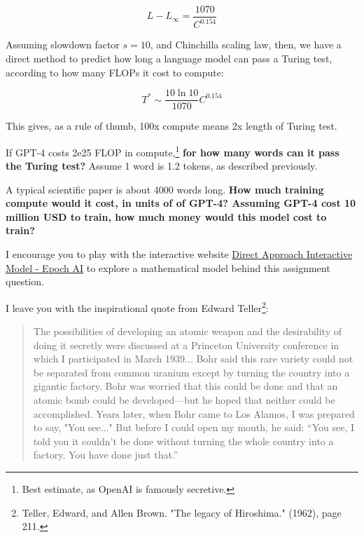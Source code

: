 \begin{enumerate}
    $$L - L_\infty = \frac{1070}{C^{0.154}}$$

    Assuming slowdown factor $s=10$, and Chinchilla scaling law, then, we have a direct method to predict how long a language model can pass a Turing test, according to how many FLOPs it cost to compute:
    
    $$T^* \sim \frac{10\ln 10}{1070}C^{0.154}$$

    This gives, as a rule of thumb, 100x compute means 2x length of Turing test.

    If GPT-4 costs 2e25 FLOP in compute,\footnote{Best estimate, as OpenAI is famously secretive.} \textbf{for how many words can it pass the Turing test?} Assume 1 word is 1.2 tokens, as described previously.


    \qitem  A typical scientific paper is about 4000 words long. \textbf{How much training compute would it cost, in units of of GPT-4? Assuming GPT-4 cost 10 million USD to train, how much money would this model cost to train?}
    

\end{enumerate}

I encourage you to play with the interactive website \href{https://epochai.org/blog/direct-approach-interactive-model}{Direct Approach Interactive Model - Epoch AI} to explore a mathematical model behind this assignment question.

I leave you with the inspirational quote from Edward Teller\footnote{Teller, Edward, and Allen Brown. "The legacy of Hiroshima." (1962), page 211.}:

\begin{quote}
    The possibilities of developing an atomic weapon and the desirability of doing it secretly were discussed at a Princeton University conference in which I participated in March 1939... Bohr said this rare variety could not be separated from common uranium except by turning the country into a gigantic factory. Bohr was worried that this could be done and that an atomic bomb could be developed—but he hoped that neither could be accomplished. Years later, when Bohr came to Los Alamos, I was prepared to say, "You see..." But before I could open my mouth, he said: “You see, I told you it couldn't be done without turning the whole country into a factory. You have done just that.”
\end{quote}
